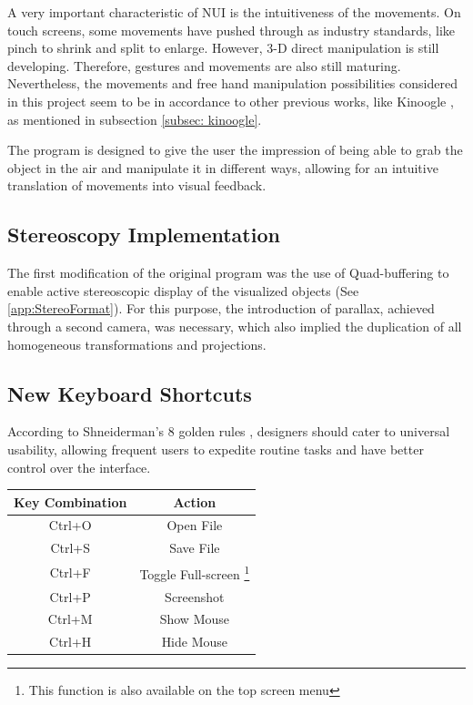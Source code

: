 \documentclass[12pt]{extarticle}
\begin{document}
A very important characteristic of NUI is the intuitiveness of the movements. On touch screens, some movements have pushed through as industry standards, like pinch to shrink and split to enlarge. However, 3-D direct manipulation is still developing. Therefore, gestures and movements are also still maturing. Nevertheless, the movements and free hand manipulation possibilities considered in this project seem to be in accordance to other previous works, like Kinoogle \cite{Kinoogle}, as mentioned in subsection \ref{subsec: kinoogle}.

The program is designed to give the user the impression of being able to grab the object in the air and manipulate it in different ways, allowing for an intuitive translation of movements into visual feedback.

\subsection {Stereoscopy Implementation}
The first modification of the original program was the use of Quad-buffering to enable active stereoscopic display of the visualized objects (See \ref{app:StereoFormat}). For this purpose, the introduction of parallax, achieved through a second camera, was necessary, which also implied the duplication of all homogeneous transformations and projections.

\subsection {New Keyboard Shortcuts}
According to Shneiderman\rq{}s 8 golden rules \cite{Shneiderman}, designers should cater to universal usability, allowing frequent users to expedite routine tasks and have better control over the interface.
\begin{center}

\begin{tabular}{|c|c|} \hline
\textbf{Key Combination} & \textbf{Action}\\ \hline
Ctrl+O & Open File\\\hline
Ctrl+S & Save File\\\hline
Ctrl+F & Toggle Full-screen \footnote{This function is also available on the top screen menu} \\\hline
Ctrl+P & Screenshot\\\hline
Ctrl+M & Show Mouse\\\hline
Ctrl+H & Hide Mouse\\\hline

\end{tabular}
\end{center}
\end{document}
